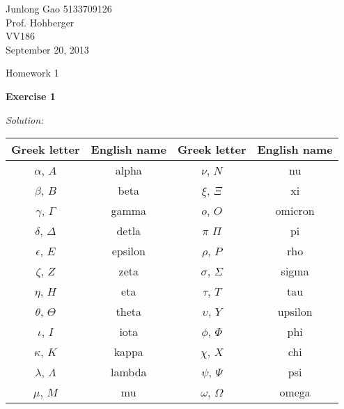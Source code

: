\documentclass[12pt]{article}
\begin{document}
\begin{flushleft}
Junlong Gao 5133709126\\
Prof. Hohberger\\
VV186\\
September 20, 2013\\%
\end{flushleft}
\indent

\begin{center}
Homework 1
\end{center}

\textbf{Exercise 1}\par
\textit{Solution:}\\
\begin{center}
\begin{tabular}{cccc}
\hline
Greek letter & English name &Greek letter &English name \\
\hline
$\alpha$, $A$ &alpha & $\nu$, $N$ &nu\\
$\beta$, $B$ &beta &$\xi$, $\Xi$ &xi\\
$\gamma$, $\Gamma$ &gamma &$o$, $O$ &omicron\\
$\delta$, $\Delta$&detla &$\pi$ $\Pi$ &pi\\
$\epsilon$, $E$ &epsilon &$\rho$, $P$ &rho\\
$\zeta$, $Z$ &zeta &$\sigma$, $\Sigma$ &sigma\\
$\eta$, $H$ &eta &$\tau$, $T$ &tau\\
$\theta$, $\Theta$ &theta &$\upsilon$, $Y$ &upsilon\\
$\iota$, $I$ &iota &$\phi$, $\Phi$ &phi\\
$\kappa$, $K$ &kappa &$\chi$, $X$ &chi\\
$\lambda$, $\Lambda$ &lambda &$\psi$, $\Psi$ &psi\\
$\mu$, $M$ &mu &$\omega$, $\Omega$ &omega\\
\hline
\end{tabular}
\end{center}
\par
\end{document}
